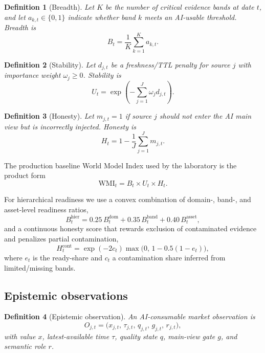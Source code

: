 \documentclass[12pt]{article}
\newtheorem{definition}{Definition}
\begin{document}
\begin{definition}[Breadth]
Let $K$ be the number of critical evidence bands at date $t$, and let $a_{k,t}\in\{0,1\}$ indicate whether band $k$ meets an AI-usable threshold. Breadth is
\begin{equation}
B_t=\frac{1}{K}\sum_{k=1}^{K}a_{k,t}.
\label{eq:breadth}
\end{equation}
\end{definition}

\begin{definition}[Stability]
Let $d_{j,t}$ be a freshness/TTL penalty for source $j$ with importance weight $\omega_j\ge 0$. Stability is
\begin{equation}
U_t=\exp\!\left(-\sum_{j=1}^{J}\omega_j d_{j,t}\right).
\label{eq:stability}
\end{equation}
\end{definition}

\begin{definition}[Honesty]
Let $m_{j,t}=1$ if source $j$ should not enter the AI main view but is incorrectly injected. Honesty is
\begin{equation}
H_t=1-\frac{1}{J}\sum_{j=1}^{J}m_{j,t}.
\label{eq:honesty}
\end{equation}
\end{definition}

The production baseline World Model Index used by the laboratory is the product form
\begin{equation}
\mathrm{WMI}_t=B_t\times U_t\times H_t.
\label{eq:wmi}
\end{equation}

For hierarchical readiness we use a convex combination of domain-, band-, and asset-level readiness ratios,
\begin{equation}
B^{\mathrm{hier}}_t=0.25\,B^{\mathrm{dom}}_t+0.35\,B^{\mathrm{band}}_t+0.40\,B^{\mathrm{asset}}_t,
\label{eq:bhier}
\end{equation}
and a continuous honesty score that rewards exclusion of contaminated evidence and penalizes partial contamination,
\begin{equation}
H^{\mathrm{cont}}_t=\exp(-2c_t)\max\!\bigl(0,\,1-0.5(1-e_t)\bigr),
\label{eq:hcont}
\end{equation}
where $e_t$ is the ready-share and $c_t$ a contamination share inferred from limited/missing bands.

\subsection{Epistemic observations}
\begin{definition}[Epistemic observation]
An AI-consumable market observation is
\begin{equation}
O_{j,t}=\bigl(x_{j,t},\,\tau_{j,t},\,q_{j,t},\,g_{j,t},\,r_{j,t}\bigr),
\label{eq:obs}
\end{equation}
with value $x$, latest-available time $\tau$, quality state $q$, main-view gate $g$, and semantic role $r$.
\end{definition}
\end{document}
